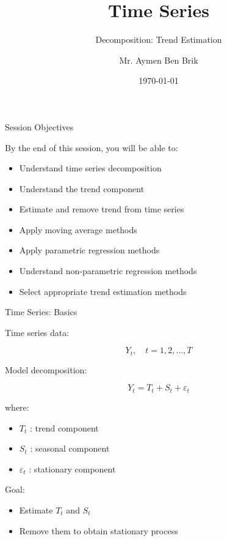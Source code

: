 \documentclass[aspectratio=169]{beamer}
\title{Time Series}
\subtitle{Decomposition: Trend Estimation}
\author{Mr. Aymen Ben Brik}
\institute{
Time Series Course 1GAMMA
}
\date{\today}
\begin{document}
\begin{frame}
\titlepage
\end{frame}

\begin{frame}{Session Objectives}

By the end of this session, you will be able to:

\begin{itemize}
\item Understand time series decomposition
\item Understand the trend component
\item Estimate and remove trend from time series
\item Apply moving average methods
\item Apply parametric regression methods
\item Understand non-parametric regression methods
\item Select appropriate trend estimation methods
\end{itemize}

\end{frame}

\begin{frame}{Time Series: Basics}

Time series data:

\[
Y_t, \quad t = 1,2,\dots,T
\]

Model decomposition:

\[
Y_t = T_t + S_t + \varepsilon_t
\]

where:

\begin{itemize}

\item $T_t$ : trend component

\item $S_t$ : seasonal component

\item $\varepsilon_t$ : stationary component

\end{itemize}

Goal:

\begin{itemize}

\item Estimate $T_t$ and $S_t$

\item Remove them to obtain stationary process

\end{itemize}

\end{frame}
\end{document}
